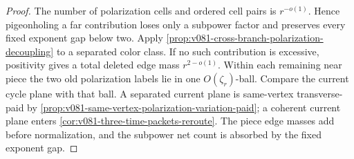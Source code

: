 \documentclass[10pt]{article}
\begin{document}
\begin{proof}
The number of polarization cells and ordered cell pairs is \(r^{-o(1)}\).  Hence pigeonholing a
far contribution loses only a subpower factor and preserves every fixed exponent gap below two.
Apply
\cref{prop:v081-cross-branch-polarization-decoupling} to a separated color class.  If no such
contribution is excessive, positivity gives a total deleted edge mass \(r^{2-o(1)}\).  Within each
remaining near piece the two old polarization labels lie in one \(O(\zeta_r)\)-ball.  Compare the
current cycle plane with that ball.  A separated current plane is same-vertex transverse-paid by
\cref{prop:v081-same-vertex-polarization-variation-paid}; a coherent current plane enters
\cref{cor:v081-three-time-packets-reroute}.  The piece edge masses add before normalization, and
the subpower net count is absorbed by the fixed exponent gap.
\end{proof}
\end{document}
